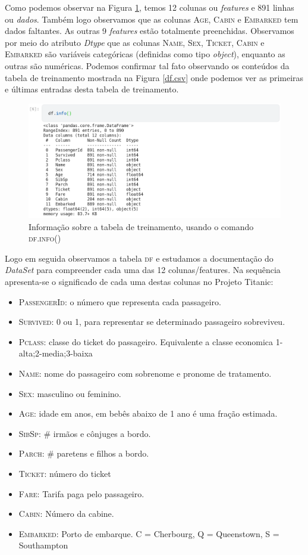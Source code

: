 Como podemos observar na Figura \ref{df.info}, temos 12 colunas ou \emph{features} e 891 linhas ou \emph{dados}. Também logo observamos que as colunas \textsc{Age, Cabin} e \textsc{Embarked} tem dados faltantes. As outras 9 \emph{features} estão totalmente preenchidas. 
Observamos por meio do atributo \emph{Dtype} que as colunas \textsc{Name, Sex, Ticket, Cabin} e \textsc{Embarked} são variáveis categóricas (definidas como tipo \emph{object}), enquanto as outras são numéricas. Podemos confirmar tal fato observando os conteúdos da tabela de treinamento mostrada na Figura \ref{df.csv} onde podemos ver as primeiras e últimas entradas desta tabela de treinamento.
\begin{figure}[H]
\centering
\includegraphics[width=\textwidth]{Figures/df.info().png}
\caption{\label{df.info}Informação sobre a tabela de treinamento, usando o comando \textsc{df.info()}}
\end{figure}

Logo em seguida observamos a tabela \textsc{df} e estudamos a documentação do \emph{DataSet} para compreender cada uma das 12 colunas/features. Na sequência apresenta-se o significado de cada uma destas colunas no Projeto Titanic:
\begin{itemize}
\item \textsc{PassengerId}: o número que representa cada passageiro. 
\item \textsc{Survived}: 0 ou 1, para representar se determinado passageiro sobreviveu.
\item \textsc{Pclass}: classe do ticket do passageiro. Equivalente a classe economica 1-alta;2-media;3-baixa
\item \textsc{Name}: nome do passageiro com sobrenome e pronome de tratamento. 
\item \textsc{Sex}: masculino ou feminino. 
\item \textsc{Age}: idade em anos, em bebês abaixo de 1 ano é uma fração estimada. 
\item \textsc{SibSp}: \# irmãos e cônjuges a bordo.
\item \textsc{Parch}: \# paretens e filhos a bordo. 
\item \textsc{Ticket}: número do ticket
\item \textsc{Fare}: Tarifa paga pelo passageiro. 
\item \textsc{Cabin}: Número da cabine. 
\item \textsc{Embarked}: Porto de embarque. C = Cherbourg, Q = Queenstown, S = Southampton
\end{itemize}

